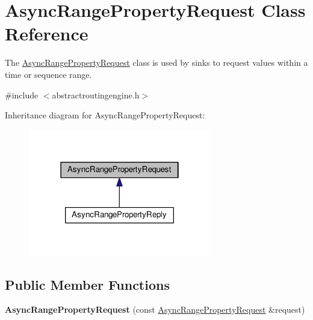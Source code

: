 \hypertarget{classAsyncRangePropertyRequest}{\section{Async\+Range\+Property\+Request Class Reference}
\label{classAsyncRangePropertyRequest}
}


The \hyperlink{classAsyncRangePropertyRequest}{Async\+Range\+Property\+Request} class is used by sinks to request values within a time or sequence range.  




{\ttfamily \#include $<$abstractroutingengine.\+h$>$}



Inheritance diagram for Async\+Range\+Property\+Request\+:\nopagebreak
\begin{figure}[H]
\begin{center}
\leavevmode
\includegraphics[width=226pt]{classAsyncRangePropertyRequest__inherit__graph}
\end{center}
\end{figure}
\subsection*{Public Member Functions}
\begin{DoxyCompactItemize}
\item 
\hypertarget{classAsyncRangePropertyRequest_aefe0f0167ce9bcabcd4450a21c7ea0e5}{{\bfseries Async\+Range\+Property\+Request} (const \hyperlink{classAsyncRangePropertyRequest}{Async\+Range\+Property\+Request} \&request)}\label{classAsyncRangePropertyRequest_aefe0f0167ce9bcabcd4450a21c7ea0e5}

\end{DoxyCompactItemize}
